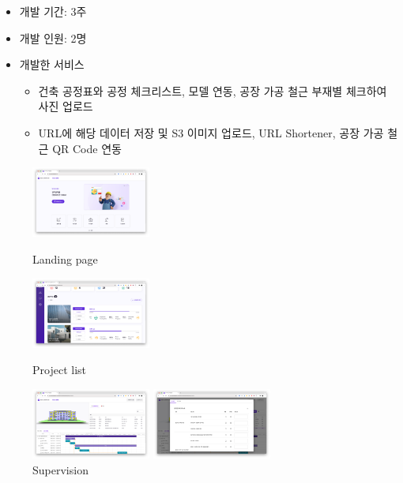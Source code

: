 \begin{itemize}[label=$\star$]
	\item 개발 기간: 3주
	\item 개발 인원: 2명
	\item 개발한 서비스
	      \begin{itemize}
		      \item 건축 공정표와 공정 체크리스트, 모델 연동, 공장 가공 철근 부재별 체크하여 사진 업로드
		      \item URL에 해당 데이터 저장 및 S3 이미지 업로드, URL Shortener, 공장 가공 철근 QR Code 연동
	      \end{itemize}
\end{itemize}
\begin{figure}[!ht]
	\begin{fullwidth}
		\parbox{0.35\textwidth}{
			\centering
			\includegraphics[width=0.35\textwidth]{images/builderhub-supervision-landing-1.png}
			\caption*{Landing page}
		}\qquad
		\parbox{0.35\textwidth}{
			\centering
			\includegraphics[width=0.35\textwidth]{images/builderhub-supervision-project-list.png}
			\caption*{Project list}
		}\qquad
		\parbox{0.35\textwidth}{
			\centering
			\includegraphics[width=0.35\textwidth]{images/builderhub-supervision-main-1.png}
			\caption*{Supervision}
		}\qquad
		\parbox{0.35\textwidth}{
			\centering
			\includegraphics[width=0.35\textwidth]{images/builderhub-supervision-checklist.png}
}
\end{fullwidth}
\end{figure}
